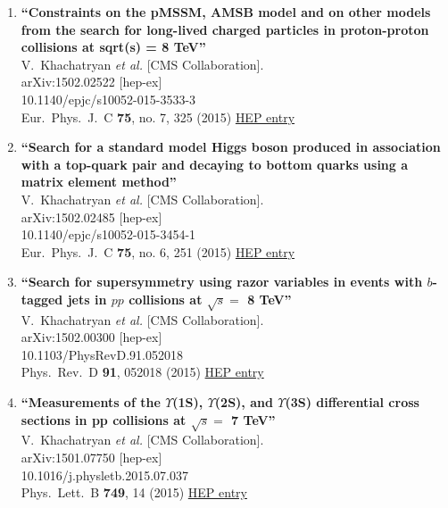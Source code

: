 \documentclass{article}
\begin{document}
\begin{enumerate}
\item%
{\bf ``Constraints on the pMSSM, AMSB model and on other models from the search for long-lived charged particles in proton-proton collisions at sqrt(s) = 8 TeV''}
  \\{}V.~Khachatryan {\it et al.} [CMS Collaboration].
  \\{}arXiv:1502.02522 [hep-ex]
    \\{}10.1140/epjc/s10052-015-3533-3
\\{}Eur.\ Phys.\ J.\ C {\bf 75}, no. 7, 325 (2015) %
\href{http://inspirehep.net/record/1343509}{HEP entry}


\item%
{\bf ``Search for a standard model Higgs boson produced in association with a top-quark pair and decaying to bottom quarks using a matrix element method''}
  \\{}V.~Khachatryan {\it et al.} [CMS Collaboration].
  \\{}arXiv:1502.02485 [hep-ex]
    \\{}10.1140/epjc/s10052-015-3454-1
\\{}Eur.\ Phys.\ J.\ C {\bf 75}, no. 6, 251 (2015) %
\href{http://inspirehep.net/record/1343506}{HEP entry}


\item%
{\bf ``Search for supersymmetry using razor variables in events with $b$-tagged jets in $pp$ collisions at $\sqrt{s} =$ 8 TeV''}
  \\{}V.~Khachatryan {\it et al.} [CMS Collaboration].
  \\{}arXiv:1502.00300 [hep-ex]
    \\{}10.1103/PhysRevD.91.052018
\\{}Phys.\ Rev.\ D {\bf 91}, 052018 (2015) %
\href{http://inspirehep.net/record/1342447}{HEP entry}


\item%
{\bf ``Measurements of the $\Upsilon$(1S), $\Upsilon$(2S), and $\Upsilon$(3S) differential cross sections in pp collisions at $\sqrt{s} =$ 7 TeV''}
  \\{}V.~Khachatryan {\it et al.} [CMS Collaboration].
  \\{}arXiv:1501.07750 [hep-ex]
    \\{}10.1016/j.physletb.2015.07.037
\\{}Phys.\ Lett.\ B {\bf 749}, 14 (2015) %
\href{http://inspirehep.net/record/1342266}{HEP entry}



\end{enumerate}
\end{document}
